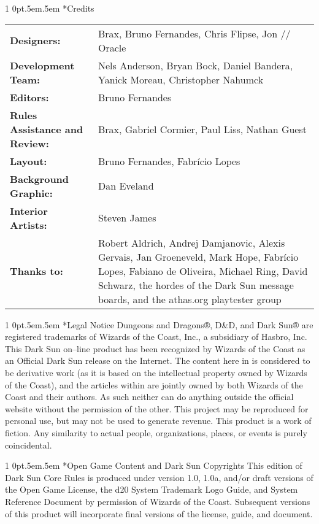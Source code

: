 \documentclass[onecolumn,oneside]{d20}
\makeatletter
\renewcommand\section{
  \@startsection{section}
  {1}
  {0pt}{.5em}{.5em}{\color{ChapterColor}\Large\scshape\raggedleft\imfellEnglish}
}
\makeatother
\begin{document}
\small
\section*{Credits}
\noindent\begin{tabularx}{\textwidth}{>{\bfseries}p{4cm} X}
  Designers: & Brax, Bruno Fernandes, Chris Flipse, Jon // Oracle \\
  Development Team: & Nels Anderson, Bryan Bock, Daniel Bandera, Yanick Moreau, Christopher Nahumck \\
  Editors: & Bruno Fernandes \\
  Rules Assistance and Review: & Brax, Gabriel Cormier, Paul Liss, Nathan Guest \\
  Layout: & Bruno Fernandes, Fabrício Lopes \\
  Background Graphic: & Dan Eveland \\
  Interior Artists: & Steven James \\
  Thanks to: & Robert Aldrich, Andrej Damjanovic, Alexis Gervais, Jan Groeneveld, Mark Hope, Fabrício Lopes, Fabiano de Oliveira, Michael Ring, David Schwarz, the hordes of the Dark Sun message boards, and the athas.org playtester group \\
\end{tabularx}

\section*{Legal Notice}
Dungeons and Dragons®, D\&D, and Dark Sun® are registered trademarks of Wizards of the Coast, Inc., a subsidiary of Hasbro, Inc. This Dark Sun on–line product has been recognized by Wizards of the Coast as an Official Dark Sun release on the Internet. The content here in is considered to be derivative work (as it is based on the intellectual property owned by Wizards of the Coast), and the articles within are jointly owned by both Wizards of the Coast and their authors. As such neither can do anything outside the official website without the permission of the other. This project may be reproduced for personal use, but may not be used to generate revenue. This product is a work of fiction. Any similarity to actual people, organizations, places, or events is purely coincidental.

\section*{Open Game Content and Dark Sun Copyrights}
This edition of Dark Sun Core Rules is produced under version 1.0, 1.0a, and/or draft versions of the Open Game License, the d20 System Trademark Logo Guide, and System Reference Document by permission of Wizards of the Coast. Subsequent versions of this product will incorporate final versions of the license, guide, and document.
\end{document}
